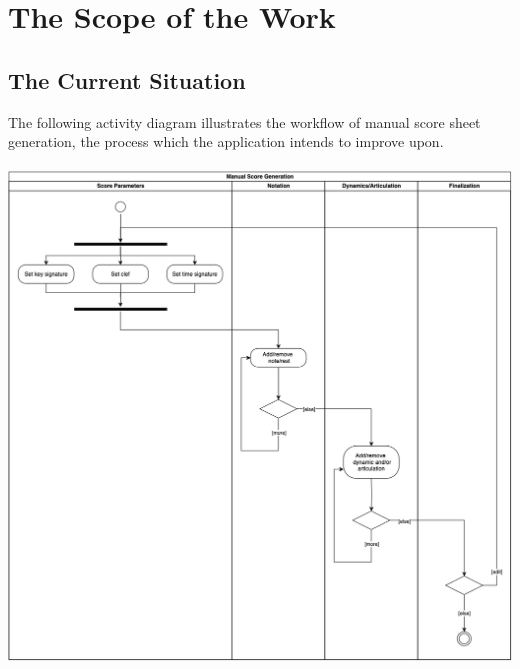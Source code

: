 \documentclass[12pt]{article}
\begin{document}
\section{The Scope of the Work}
\subsection{The Current Situation}
The following activity diagram illustrates the workflow of manual score sheet generation, the process
which the application intends to improve upon.\\\\
\includegraphics[width=\textwidth]{SRS-manual-score-process-revised.png}
\end{document}
